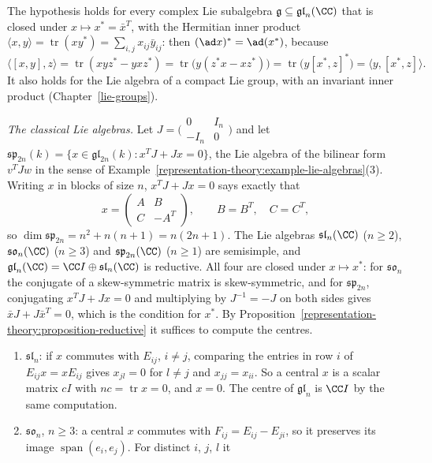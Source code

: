 The hypothesis holds for every complex Lie subalgebra $\mathfrak{g} \subseteq \mathfrak{gl}_n(\CC)$ that is closed under $x \mapsto x^* = \bar x^T$, with the Hermitian inner product
$\langle x, y\rangle = \operatorname{tr}(xy^*) = \sum_{i,j}x_{ij}\bar y_{ij}$: then $(\ad x)^* = \ad(x^*)$, because
\[
\langle[x, y], z\rangle = \operatorname{tr}(xyz^* - yxz^*) = \operatorname{tr}\bigl(y(z^*x - xz^*)\bigr) = \operatorname{tr}\bigl(y[x^*, z]^*\bigr) = \langle y, [x^*, z]\rangle .
\]
It also holds for the Lie algebra of a compact Lie group, with an invariant inner product (Chapter~\ref{lie-groups}).

\begin{example}\label{representation-theory:example-classical}
\emph{The classical Lie algebras.} Let $J = \bigl(\begin{smallmatrix}0 & I_n\\ -I_n & 0\end{smallmatrix}\bigr)$ and let $\mathfrak{sp}_{2n}(k) = \{x \in \mathfrak{gl}_{2n}(k) : x^TJ + Jx
= 0\}$, the Lie algebra of the bilinear form $v^TJw$ in the sense of Example~\ref{representation-theory:example-lie-algebras}(3). Writing $x$ in blocks of size $n$,
$x^TJ + Jx = 0$ says exactly that
\[
x = \begin{pmatrix}A & B\\ C & -A^T\end{pmatrix}, \qquad B = B^T, \quad C = C^T,
\]
so $\dim\mathfrak{sp}_{2n} = n^2 + n(n+1) = n(2n + 1)$. The Lie algebras $\mathfrak{sl}_n(\CC)$ ($n \geq 2$), $\mathfrak{so}_n(\CC)$ ($n \geq 3$) and $\mathfrak{sp}_{2n}(\CC)$
($n \geq 1$) are semisimple, and $\mathfrak{gl}_n(\CC) = \CC I \oplus \mathfrak{sl}_n(\CC)$ is reductive. All four are closed under $x \mapsto x^*$: for $\mathfrak{so}_n$ the
conjugate of a skew-symmetric matrix is skew-symmetric, and for $\mathfrak{sp}_{2n}$, conjugating $x^TJ + Jx = 0$ and multiplying by $J^{-1} = -J$ on both sides gives
$\bar xJ + J\bar x^T = 0$, which is the condition for $x^*$. By Proposition~\ref{representation-theory:proposition-reductive} it suffices to compute the centres.
\begin{enumerate}
\item $\mathfrak{sl}_n$: if $x$ commutes with $E_{ij}$, $i \neq j$, comparing the entries in row $i$ of $E_{ij}x = xE_{ij}$ gives $x_{jl} = 0$ for $l \neq j$ and $x_{jj} = x_{ii}$.
So a central $x$ is a scalar matrix $cI$ with $nc = \operatorname{tr}x = 0$, and $x = 0$. The centre of $\mathfrak{gl}_n$ is $\CC I$ by the same computation.
\item $\mathfrak{so}_n$, $n \geq 3$: a central $x$ commutes with $F_{ij} = E_{ij} - E_{ji}$, so it preserves its image $\operatorname{span}(e_i, e_j)$. For distinct $i$, $j$, $l$ it

\end{enumerate}
\end{example}
